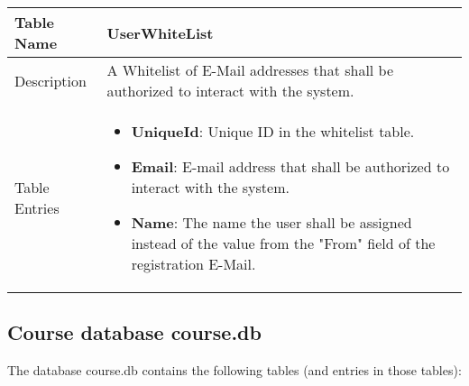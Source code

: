 \begin{tabular}{|p{3cm}|p{10cm}|}
\hline
Table Name & UserWhiteList \\
\hline
Description & A Whitelist of E-Mail addresses that shall be authorized to interact with the system.\\
\hline
Table Entries & \begin{itemize}
        \item {\bf UniqueId}: Unique ID in the whitelist table.
        \item {\bf Email}: E-mail address that shall be authorized to interact with the system.
		\item {\bf Name}: The name the user shall be assigned instead of the value from the
			"From" field of the registration E-Mail.
        \end{itemize} \\
\hline
\end{tabular}

\newpage

\subsection{Course database course.db} \label{app:course.db}

The database course.db contains the following tables (and entries in those tables):

